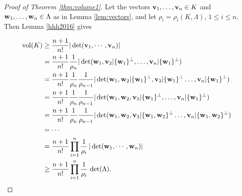 \documentclass{amsart}
\theoremstyle{definition}
\theoremstyle{remark}
\numberwithin{equation}{section}
\begin{document}
\begin{proof}[{\it Proof of Theorem \ref{thm:volume1}}]
Let the vectors ${\bf v}_1,\dots,{\bf v}_n\in K$ and ${\bf w}_1,\dots,{\bf w}_n\in\Lambda$ as in Lemma \ref{lem:vectors}, and let $\rho_i=\rho_i(K,\Lambda)$, $1\leq i\leq n$.  Then Lemma \ref{hhh2016} gives  

\begin{equation*}
\begin{split}
      \mathrm{vol}(K) & \ge\frac{n+1}{n!}|\det({\bf v}_1,\cdots,{\bf v}_n)|\\
                  & =\frac{n+1}{n!}\frac{1}{\rho_n}|\det({\bf w}_1, {\bf v}_2|\{{\bf w}_1\}^\perp,\dots, {\bf v}_n|\{{\bf w}_1\}^\perp)    \\ & 
                  =\frac{n+1}{n!}\frac{1}{\rho_n}\frac{1}{\rho_{n-1}}|\det({\bf w}_1, {\bf w}_2|\{{\bf w}_1\}^\perp,{\bf v}_3|\{{\bf w}_1\}^\perp\dots, {\bf v}_n|\{{\bf w}_1\}^\perp)\\
                  &=\frac{n+1}{n!}\frac{1}{\rho_n}\frac{1}{\rho_{n-1}}|\det({\bf w}_1, {\bf w}_2,{\bf v}_3|\{{\bf w}_1\}^\perp, \dots, {\bf v}_n|\{{\bf w}_1\}^\perp)\\ 
                  &= \frac{n+1}{n!}\frac{1}{\rho_n}\frac{1}{\rho_{n-1}}|\det({\bf w}_1, {\bf w}_2,{\bf v}_3|\{{\bf w}_1, {\bf w}_2\}^\perp\dots, {\bf v}_n|\{{\bf w}_1, {\bf w}_2\}^\perp)  \\ 
                  &=\cdots \\ 
                  &=\frac{n+1}{n!}\prod_{i=1}^n \frac{1}{\rho_i}\,|\det({\bf w}_1,\cdots,{\bf w}_n)|
                  \\
                  &\geq \frac{n+1}{n!}\prod_{i=1}^n \frac{1}{\rho_i}\,\det(\Lambda).
\end{split}
\end{equation*} 

\end{proof}
\end{document}
